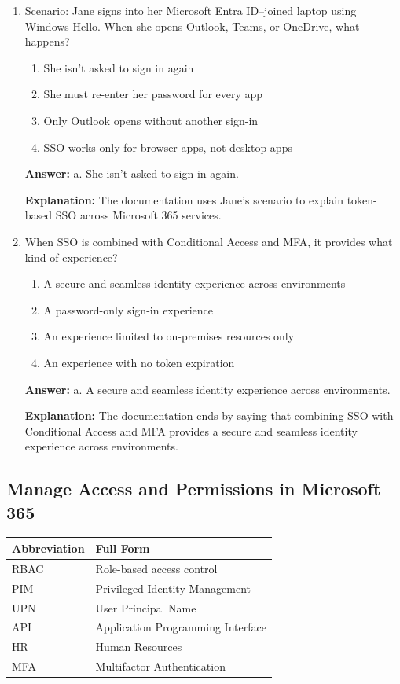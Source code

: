 \documentclass[10pt]{article}
\begin{document}
\begin{enumerate}[leftmargin=*]
\item Scenario: Jane signs into her Microsoft Entra ID–joined laptop using Windows Hello. When she opens Outlook, Teams, or OneDrive, what happens?
\begin{enumerate}[label=\alph*., leftmargin=1.5em]
\item She isn’t asked to sign in again
\item She must re-enter her password for every app
\item Only Outlook opens without another sign-in
\item SSO works only for browser apps, not desktop apps
\end{enumerate}
\textbf{Answer:} a. She isn’t asked to sign in again.

\textbf{Explanation:} The documentation uses Jane’s scenario to explain token-based SSO across Microsoft 365 services.

\item When SSO is combined with Conditional Access and MFA, it provides what kind of experience?
\begin{enumerate}[label=\alph*., leftmargin=1.5em]
\item A secure and seamless identity experience across environments
\item A password-only sign-in experience
\item An experience limited to on-premises resources only
\item An experience with no token expiration
\end{enumerate}
\textbf{Answer:} a. A secure and seamless identity experience across environments.

\textbf{Explanation:} The documentation ends by saying that combining SSO with Conditional Access and MFA provides a secure and seamless identity experience across environments.

\end{enumerate}
\clearpage

\subsection{Manage Access and Permissions in Microsoft 365}

\begin{center}
\begin{tabular}{>{\raggedright\arraybackslash}p{} >{\raggedright\arraybackslash}p{}}
\toprule
\textbf{Abbreviation} & \textbf{Full Form} \\
\midrule
RBAC & Role-based access control \\
PIM & Privileged Identity Management \\
UPN & User Principal Name \\
API & Application Programming Interface \\
HR & Human Resources \\
MFA & Multifactor Authentication \\
\bottomrule
\end{tabular}
\end{center}
\end{document}
